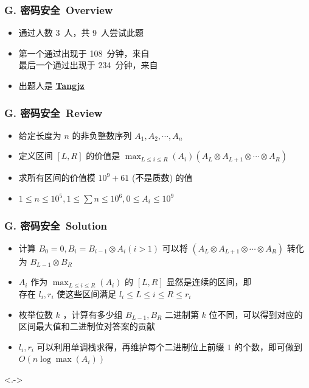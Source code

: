 \documentclass[notheorems]{beamer}
\newcommand{\zhProbG}{密码安全}		\newcommand{\AuthProbG}{\textbf{\underline{\href{http://codeforces.com/profile/Tangjz}{Tangjz}}}}
\newcommand{\AccInProbG}{3}	\newcommand{\SubInProbG}{9}	\newcommand{\RatInProbG}{33.33\%}
\newcommand{\FirPenInProbG}{108}	\newcommand{\FirPerInProbG}{\NONE}
\newcommand{\LasPenInProbG}{234}	\newcommand{\LasPerInProbG}{\NONE}
\begin{document}
\begin{frame}[label = ProbG]
\frametitle{G. \zhProbG\ Overview}
\begin{spacing}{2.0} \large
\begin{itemize}[<+->]
\item 通过人数 \AccInProbG\ 人，共 \SubInProbG\ 人尝试此题
\item 第一个通过出现于 \FirPenInProbG\ 分钟，来自 \FirPerInProbG\ 
\\ 最后一个通过出现于 \LasPenInProbG\ 分钟，来自 \LasPerInProbG\ 
\item 出题人是 \AuthProbG\ 
\end{itemize}
\end{spacing}
\end{frame}
\begin{frame}
\frametitle{G. \zhProbG\ Review}
\begin{spacing}{2.0} \large
\begin{itemize}[<+->]
\item 给定长度为 $n$ 的非负整数序列 $A_1, A_2, \cdots, A_n$
\item 定义区间 $[L, R]$ 的价值是 $\displaystyle{\max_{L \leq i \leq R}(A_i)} (A_L \otimes A_{L+1} \otimes \cdots \otimes A_R)$
\item 求所有区间的价值模 $10^9 + 61$ (不是质数) 的值
\item $1 \leq n \leq 10^5, 1 \leq \sum{n} \leq 10^6, 0 \leq A_i \leq 10^9$
\end{itemize}
\end{spacing}
\end{frame}
\begin{frame}
\frametitle{G. \zhProbG\ Solution}
\begin{spacing}{1.8} \large
\begin{itemize}[<+->]
\item 计算 $B_0 = 0, B_i = B_{i - 1} \otimes A_i (i > 1)$ 可以将 $(A_L \otimes A_{L+1} \otimes \cdots \otimes A_R)$ 转化为 $B_{L - 1} \otimes B_{R}$
\item  $A_i$ 作为 $\displaystyle{\max_{L \leq i \leq R}(A_i)}$ 的 $[L, R]$ 显然是连续的区间，即 \\ 存在 $l_i, r_i$ 使这些区间满足 $l_i \leq L \leq i \leq R \leq r_i$
\item 枚举位数 $k$ ，计算有多少组 $B_{L-1}, B_R$ 二进制第 $k$ 位不同，可以得到对应的\alert{区间最大值}和\alert{二进制位}对答案的贡献
\item $l_i, r_i$ 可以利用单调栈求得，再维护每个二进制位上前缀 $1$ 的个数，即可做到 $O(n \log \max(A_i))$
\end{itemize}
\end{spacing}
\visible<.->{\hyperlink{Overview}{\beamerreturnbutton{Go Back}}}
\end{frame}
\end{document}
